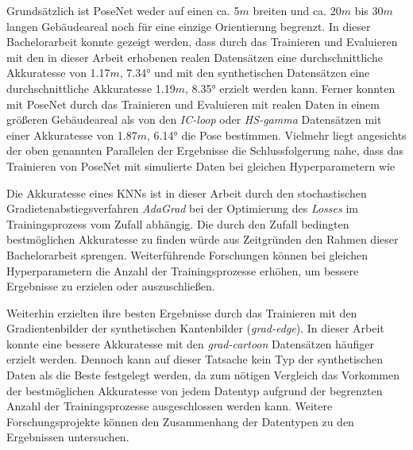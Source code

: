 







Grundsätzlich ist PoseNet weder auf einen ca. 5$m$ breiten und ca. 20$m$ bis 30$m$ langen Gebäudeareal noch für eine einzige Orientierung begrenzt. In dieser Bachelorarbeit konnte gezeigt werden, dass durch das Trainieren und Evaluieren mit den in dieser Arbeit erhobenen realen Datensätzen eine durchschnittliche Akkuratesse von 1.17$m$, 7.34° und mit den synthetischen Datensätzen eine durchschnittliche Akkuratesse 1.19$m$, 8.35° erzielt werden kann. Ferner konnten \citet{walchImageBasedLocalizationUsing2017} mit PoseNet durch das Trainieren und Evaluieren mit realen Daten in einem größeren Gebäudeareal als von den \textit{IC-loop} oder \textit{HS-gamma} Datensätzen mit einer Akkuratesse von 1.87$m$, 6.14° die Pose bestimmen. Vielmehr liegt angesichts der oben genannten Parallelen der Ergebnisse die Schlussfolgerung nahe, dass das Trainieren von PoseNet mit simulierte Daten bei gleichen Hyperparametern wie  \citet{acharyaBIMPoseNetIndoorCamera2019} 





 








Die Akkuratesse eines KNNs ist in dieser Arbeit durch den stochastischen Gradietenabstiegsverfahren \textit{AdaGrad} bei der Optimierung des \textit{Losses} im Trainingsprozess vom Zufall abhängig. Die durch den Zufall bedingten bestmöglichen Akkuratesse zu finden würde aus Zeitgründen den Rahmen dieser Bachelorarbeit sprengen. Weiterführende Forschungen können bei gleichen Hyperparametern die Anzahl der Trainingsprozesse erhöhen, um bessere Ergebnisse zu erzielen oder auszuschließen.

Weiterhin erzielten \citet{acharyaBIMPoseNetIndoorCamera2019} ihre besten Ergebnisse durch das Trainieren mit den Gradientenbilder der synthetischen Kantenbilder (\textit{grad-edge}). In dieser Arbeit konnte eine bessere Akkuratesse mit den \textit{grad-cartoon} Datensätzen häufiger erzielt werden. Dennoch kann auf dieser Tatsache kein Typ der synthetischen Daten als die Beste festgelegt werden, da zum nötigen Vergleich das Vorkommen der bestmöglichen Akkuratesse von jedem Datentyp aufgrund der begrenzten Anzahl der Trainingsprozesse ausgeschlossen werden kann. Weitere Forschungsprojekte können den Zusammenhang der Datentypen zu den Ergebnissen untersuchen.


